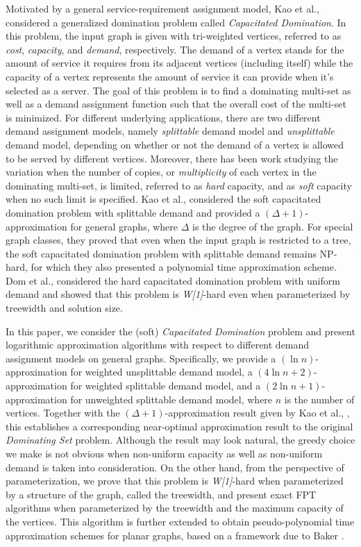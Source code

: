 \documentclass[a4paper,11pt]{article}
\theoremstyle{definition}
\begin{document}
Motivated by a general service-requirement assignment model, Kao et al., \cite{MJKCSLDTL09} considered a generalized domination problem called {\em Capacitated Domination}. In this problem, the input graph is given with tri-weighted vertices, referred to as {\em cost}, {\em capacity}, and {\em demand}, respectively. The demand of a vertex stands for the amount of service it requires from its adjacent vertices (including itself) while the capacity of a vertex represents the amount of service it can provide when it's selected as a server. The goal of this problem is to find a dominating multi-set as well as a demand assignment function such that the overall cost of the multi-set is minimized. For different underlying applications, there are two different demand assignment models, namely {\em splittable} demand model and {\em unsplittable} demand model, depending on whether or not the demand of a vertex is allowed to be served by different vertices. Moreover, there has been work studying the variation when the number of copies, or {\it multiplicity} of each vertex in the dominating multi-set, is limited, referred to as {\em hard} capacity, and as {\em soft} capacity when no such limit is specified. Kao et al., \cite{MJKCSLDTL09} considered the soft capacitated domination problem with splittable demand and provided a $(\Delta+1)$-approximation for general graphs, where $\Delta$ is the degree of the graph. For special graph classes, they proved that even when the input graph is restricted to a tree, the soft capacitated domination problem with splittable demand remains NP-hard, for which they also presented a polynomial time approximation scheme. Dom et al., \cite{DBLP:conf/iwpec/DomLSV08} considered the hard capacitated domination problem with uniform demand and showed that this problem is {\it W[1]}-hard even when parameterized by treewidth and solution size.

\smallskip



In this paper, we consider the (soft) {\em Capacitated Domination} problem and present logarithmic approximation algorithms with respect to different demand assignment models on general graphs. Specifically, we provide a $(\ln n)$-approximation
for weighted unsplittable demand model, a $(4\ln n+2)$-approximation for weighted splittable demand model, and a $(2\ln n+1)$-approximation for unweighted splittable demand model, where $n$ is the number of vertices. Together with the $(\Delta+1)$-approximation result given by Kao et al., \cite{MJKCSLDTL09}, this establishes a corresponding near-optimal approximation result to the original {\em Dominating Set} problem. Although the result may look natural, the greedy choice we make is not obvious when non-uniform capacity as well as non-uniform demand is taken into consideration. On the other hand, from the perspective of parameterization, we prove that this problem is {\it W[1]}-hard when parameterized by a structure of the graph, called the treewidth, and present exact FPT algorithms when parameterized by the treewidth and the maximum capacity of the vertices. 
This algorithm is further extended to obtain pseudo-polynomial time approximation schemes for planar graphs, based on a framework due to Baker \cite{174650}.
\end{document}
